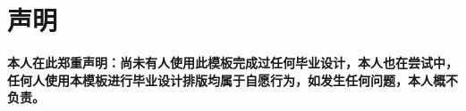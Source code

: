 \chapter*{\heibd 声明}\thispagestyle{empty}
\textbf{\songbd 本人在此郑重声明：尚未有人使用此模板完成过任何毕业设计，本人也在尝试中，任何人使用本模板进行毕业设计排版均属于自愿行为，如发生任何问题，本人概不负责。}
